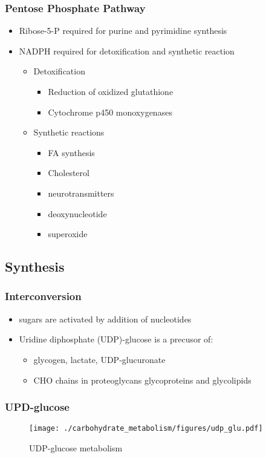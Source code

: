 \documentclass{scrartcl}
\begin{document}
\subsubsection{Pentose Phosphate Pathway}
\label{sec:org0102433}

\begin{itemize}
\item Ribose-5-P required for purine and pyrimidine synthesis
\item NADPH required for detoxification and synthetic reaction
\begin{itemize}
\item Detoxification
\begin{itemize}
\item Reduction of oxidized glutathione
\item Cytochrome p450 monoxygenases
\end{itemize}
\item Synthetic reactions
\begin{itemize}
\item FA synthesis
\item Cholesterol
\item neurotransmitters
\item deoxynucleotide
\item superoxide
\end{itemize}
\end{itemize}
\end{itemize}

\subsection{Synthesis}
\label{sec:org3ede8e4}
\subsubsection{Interconversion}
\label{sec:org6e713e5}
\begin{itemize}
\item sugars are activated by addition of nucleotides
\item Uridine diphosphate (UDP)-glucose is a precusor of:
\begin{itemize}
\item glycogen, lactate, UDP-glucuronate
\item CHO chains in proteoglycans glycoproteins and glycolipids
\end{itemize}
\end{itemize}
\subsubsection{UPD-glucose}
\label{sec:org286c3e7}
\begin{figure}[htbp]
\centering
\texttt{[image: ./carbohydrate\_metabolism/figures/udp\_glu.pdf]}
\caption{\label{fig:org96d4290}
UDP-glucose metabolism}
\end{figure}
\end{document}
